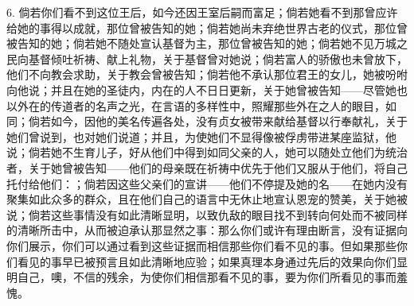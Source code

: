 6. 倘若你们看不到这位王后，如今还因王室后嗣而富足；倘若她看不到那曾应许给她的事得以成就，那位曾被告知的她；倘若她尚未弃绝世界古老的仪式，那位曾被告知的她；倘若她不随处宣认基督为主，那位曾被告知的她；倘若她不见万城之民向基督倾吐祈祷、献上礼物，关于基督曾对她说；倘若富人的骄傲也未曾放下，他们不向教会求助，关于教会曾被告知；倘若他不承认那位君王的女儿，她被吩咐向他说；并且在她的圣徒内，内在的人不日日更新，关于她曾被告知——尽管她也以外在的传道者的名声之光，在言语的多样性中，照耀那些外在之人的眼目，如同；倘若如今，因他的美名传遍各处，没有贞女被带来献给基督以行奉献礼，关于她们曾说到，也对她们说道；并且，为使她们不显得像被俘虏带进某座监狱，他说；倘若她不生育儿子，好从他们中得到如同父亲的人，她可以随处立他们为统治者，关于她曾被告知——他们的母亲既在祈祷中优先于他们又服从于他们，将自己托付给他们：；倘若因这些父亲们的宣讲——他们不停提及她的名——在她内没有聚集如此众多的群众，且在他们自己的语言中无休止地宣认恩宠的赞美，关于她被说；倘若这些事情没有如此清晰显明，以致仇敌的眼目找不到转向何处而不被同样的清晰所击中，从而被迫承认那显然之事：那么你们或许有理由断言，没有证据向你们展示，你们可以通过看到这些证据而相信那些你们看不见的事。但如果那些你们看见的事早已被预言且如此清晰地应验；如果真理本身通过先后的效果向你们显明自己，噢，不信的残余，为使你们相信那看不见的事，要为你们所看见的事而羞愧。\par

